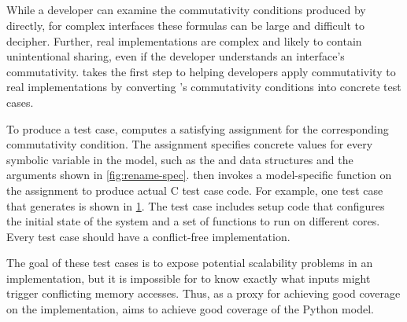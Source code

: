 \subsection{\testgen}
\label{sec:tool:generator}

While a developer can examine the commutativity conditions
produced by \analyzer directly, for complex interfaces these formulas
can be large and difficult to decipher.  Further, real implementations
are complex and likely to contain unintentional sharing, even if the
developer understands an interface's commutativity.  \testgen takes
the first step to helping developers apply commutativity to real
implementations by converting \analyzer's commutativity conditions into
concrete test cases.

To produce a test case, \testgen computes
a satisfying assignment for the corresponding commutativity condition.
The assignment specifies concrete values for every symbolic variable in
the model, such as the  and  data structures
and the  arguments shown in \cref{fig:rename-spec}.
\testgen then invokes a model-specific function on the assignment
to produce actual C test case code.  For example, one test
case that \testgen generates is shown in \cref{fig:testgen}.
The test case includes setup code that configures the initial state of
the system and a set of functions to run on different cores. Every
\testgen test case should have a conflict-free implementation.

\begin{figure}
%
\label{fig:testgen}
\end{figure}

The goal of these test cases is to expose potential scalability problems
in an implementation, but it is impossible for \testgen to know
exactly what inputs might trigger conflicting memory accesses.  Thus, as a
proxy for achieving good coverage on the implementation, \testgen
aims to achieve good coverage of the Python model.


